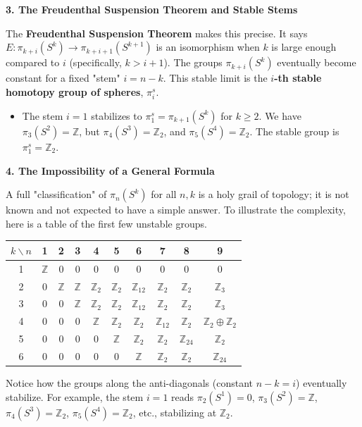 \begin{remark}
\textbf{3. The Freudenthal Suspension Theorem and Stable Stems}

The \textbf{Freudenthal Suspension Theorem} makes this precise. It says $E: \pi_{k+i}(S^k) \to \pi_{k+i+1}(S^{k+1})$ is an isomorphism when $k$ is large enough compared to $i$ (specifically, $k > i+1$). The groups $\pi_{k+i}(S^k)$ eventually become constant for a fixed "stem" $i = n-k$. This stable limit is the \textbf{$i$-th stable homotopy group of spheres}, $\pi_i^s$.
\begin{itemize}
    \item The stem $i=1$ stabilizes to $\pi_1^s = \pi_{k+1}(S^k)$ for $k \ge 2$. We have $\pi_3(S^2)=\mathbb{Z}$, but $\pi_4(S^3)=\mathbb{Z}_2$, and $\pi_5(S^4)=\mathbb{Z}_2$. The stable group is $\pi_1^s = \mathbb{Z}_2$.
\end{itemize}

\textbf{4. The Impossibility of a General Formula}

A full "classification" of $\pi_n(S^k)$ for all $n,k$ is a holy grail of topology; it is not known and not expected to have a simple answer. To illustrate the complexity, here is a table of the first few unstable groups.

\begin{center}
\begin{tabular}{c|ccccccccc}
$k\backslash n$ & 1 & 2 & 3 & 4 & 5 & 6 & 7 & 8 & 9 \\
\hline
1 & $\mathbb{Z}$ & 0 & 0 & 0 & 0 & 0 & 0 & 0 & 0 \\
2 & 0 & $\mathbb{Z}$ & $\mathbb{Z}$ & $\mathbb{Z}_2$ & $\mathbb{Z}_2$ & $\mathbb{Z}_{12}$ & $\mathbb{Z}_2$ & $\mathbb{Z}_2$ & $\mathbb{Z}_3$ \\
3 & 0 & 0 & $\mathbb{Z}$ & $\mathbb{Z}_2$ & $\mathbb{Z}_2$ & $\mathbb{Z}_{12}$ & $\mathbb{Z}_2$ & $\mathbb{Z}_2$ & $\mathbb{Z}_3$ \\
4 & 0 & 0 & 0 & $\mathbb{Z}$ & $\mathbb{Z}_2$ & $\mathbb{Z}_2$ & $\mathbb{Z}_{12}$ & $\mathbb{Z}_2$ & $\mathbb{Z}_2 \oplus \mathbb{Z}_2$ \\
5 & 0 & 0 & 0 & 0 & $\mathbb{Z}$ & $\mathbb{Z}_2$ & $\mathbb{Z}_2$ & $\mathbb{Z}_{24}$ & $\mathbb{Z}_2$ \\
6 & 0 & 0 & 0 & 0 & 0 & $\mathbb{Z}$ & $\mathbb{Z}_2$ & $\mathbb{Z}_2$ & $\mathbb{Z}_{24}$ \\
\end{tabular}
\end{center}
Notice how the groups along the anti-diagonals (constant $n-k=i$) eventually stabilize. For example, the stem $i=1$ reads $\pi_2(S^1)=0$, $\pi_3(S^2)=\mathbb{Z}$, $\pi_4(S^3)=\mathbb{Z}_2$, $\pi_5(S^4)=\mathbb{Z}_2$, etc., stabilizing at $\mathbb{Z}_2$.


\end{remark}
